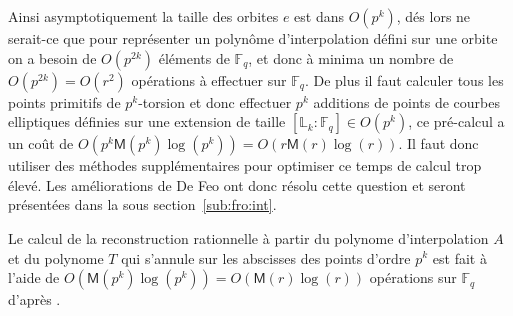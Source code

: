 \documentclass[10pt,a4paper]{book}
\theoremstyle{plain}
\theoremstyle{definition}
\newtheorem{lem}[thm]{Lemme}
\theoremstyle{definition}
\theoremstyle{definition}
\theoremstyle{definition}
\theoremstyle{remark}
\theoremstyle{remark}
\theoremstyle{definition}
\begin{document}
Ainsi asymptotiquement la taille des orbites $e$ est dans $O(p^k)$, dés lors ne
serait-ce que pour représenter un polynôme d'interpolation défini sur une 
orbite on a besoin de $O(p^{2k})$ éléments de $\mathbb{F}_q$, et donc à minima 
un nombre de $O(p^{2k})=O(r^2)$ opérations à effectuer sur $\mathbb{F}_q$. De 
plus il faut calculer tous les points primitifs de $p^k$-torsion et donc 
effectuer $p^k$ additions de points de courbes elliptiques définies sur une 
extension de taille $[\mathbb{L}_k:\mathbb{F}_q] \in O(p^k) $, ce pré-calcul a 
un coût de $O(p^k\mathsf{M}(p^k)\log(p^k))=O(r\mathsf{M}(r)\log(r))$. Il faut 
donc utiliser des méthodes supplémentaires pour optimiser ce temps de calcul 
trop élevé. Les améliorations de De Feo \cite{DeFeo11} ont donc résolu cette 
question et seront présentées dans la sous section~\ref{sub:fro:int}.

Le calcul de la reconstruction rationnelle à partir du polynome d'interpolation $A$ et du polynome $T$ qui s'annule sur les abscisses des points d'ordre $p^k$ est fait à l'aide de $O(\mathsf{M}(p^{k})\log(p^k))=O(\mathsf{M}(r)\log(r))$ opérations sur $\mathbb{F}_q$ d'après \cite[§ 11.1]{vzGJG03}.

%
\end{document}
